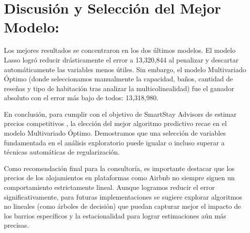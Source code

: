 \documentclass[
]{article}
\begin{document}
\section{Discusión y Selección del Mejor
Modelo:}\label{discusiuxf3n-y-selecciuxf3n-del-mejor-modelo}

Los mejores resultados se concentraron en los dos últimos modelos. El
modelo Lasso logró reducir drásticamente el error a 13,320,844 al
penalizar y descartar automáticamente las variables menos útiles. Sin
embargo, el modelo Multivariado Óptimo (donde seleccionamos manualmente
la capacidad, baños, cantidad de reseñas y tipo de habitación tras
analizar la multicolinealidad) fue el ganador absoluto con el error más
bajo de todos: 13,318,980.

En conclusión, para cumplir con el objetivo de SmartStay Advisors de
estimar precios competitivos , la elección del mejor algoritmo
predictivo recae en el modelo Multivariado Óptimo. Demostramos que una
selección de variables fundamentada en el análisis exploratorio puede
igualar o incluso superar a técnicas automáticas de regularización.

Como recomendación final para la consultoría, es importante destacar que
los precios de los alojamientos en plataformas como Airbnb no siempre
siguen un comportamiento estrictamente lineal. Aunque logramos reducir
el error significativamente, para futuras implementaciones se sugiere
explorar algoritmos no lineales (como árboles de decisión) que puedan
capturar mejor el impacto de los barrios específicos y la estacionalidad
para lograr estimaciones aún más precisas.
\end{document}
